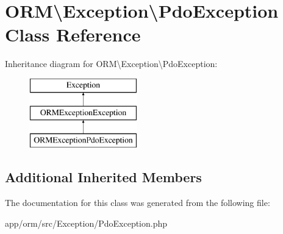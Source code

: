 \hypertarget{classORM_1_1Exception_1_1PdoException}{}\section{O\+RM\textbackslash{}Exception\textbackslash{}Pdo\+Exception Class Reference}
\label{classORM_1_1Exception_1_1PdoException}
Inheritance diagram for O\+RM\textbackslash{}Exception\textbackslash{}Pdo\+Exception\+:\begin{figure}[H]
\begin{center}
\leavevmode
\includegraphics[height=3.000000cm]{classORM_1_1Exception_1_1PdoException}
\end{center}
\end{figure}
\subsection*{Additional Inherited Members}


The documentation for this class was generated from the following file\+:\begin{DoxyCompactItemize}
\item 
app/orm/src/\+Exception/Pdo\+Exception.\+php\end{DoxyCompactItemize}
